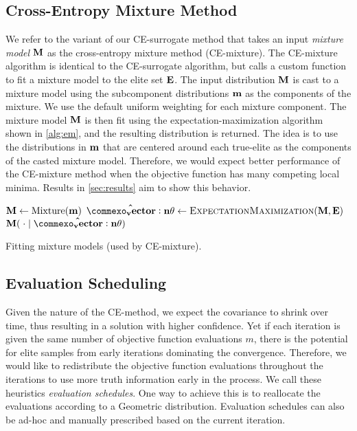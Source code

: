 \subsection{Cross-Entropy Mixture Method} \label{sec:alg_ce_mixture}
We refer to the variant of our CE-surrogate method that takes an input \textit{mixture model} $\mathbf{M}$ as the cross-entropy mixture method (CE-mixture).
The CE-mixture algorithm is identical to the CE-surrogate algorithm, but calls a custom  function to fit a mixture model to the elite set $\mathbf{E}$.
The input distribution $\mathbf{M}$ is cast to a mixture model using the subcomponent distributions $\mathbf{m}$ as the components of the mixture.
We use the default uniform weighting for each mixture component.
The mixture model $\mathbf{M}$ is then fit using the expectation-maximization algorithm shown in \cref{alg:em}, and the resulting distribution is returned.
The idea is to use the distributions in $\mathbf{m}$ that are centered around each true-elite as the components of the casted mixture model.
Therefore, we would expect better performance of the CE-mixture method when the objective function has many competing local minima.
Results in \cref{sec:results} aim to show this behavior.

\begin{algorithm}[ht]
  \begin{algorithmic}
    \State $\mathbf{M} \leftarrow \operatorname{Mixture}( \mathbf{m} )$
    \State $\mathbf{\hat{\vec{\theta}}} \leftarrow \textproc{ExpectationMaximization}(\M, \bfE)$
    \State \Return $\M(\;\cdot \mid \mathbf{\hat{\vec{\theta}}})$
  \EndFunction
  \end{algorithmic}
  \caption{\label{alg:ce_mixture_fit} Fitting mixture models (used by CE-mixture).}
\end{algorithm}


\subsection{Evaluation Scheduling} \label{sec:alg_eval_schedule}
Given the nature of the CE-method, we expect the covariance to shrink over time, thus resulting in a solution with higher confidence.
Yet if each iteration is given the same number of objective function evaluations $m$, there is the potential for elite samples from early iterations dominating the convergence.
Therefore, we would like to redistribute the objective function evaluations throughout the iterations to use more truth information early in the process.
We call these heuristics \textit{evaluation schedules}.
One way to achieve this is to reallocate the evaluations according to a Geometric distribution.
Evaluation schedules can also be ad-hoc and manually prescribed based on the current iteration.

